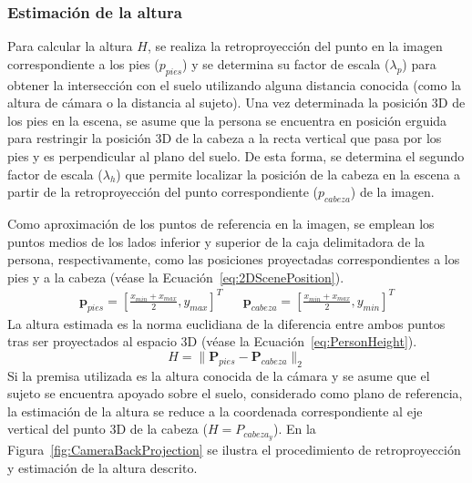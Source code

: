 \subsubsection*{Estimación de la altura}
Para calcular la altura $H$, se realiza la retroproyección del punto en la imagen correspondiente a los pies ($p_{pies}$) y se determina su
factor de escala ($\lambda_p$) para obtener la intersección con el suelo utilizando alguna distancia conocida (como la altura de cámara o la distancia al sujeto).
Una vez determinada la posición 3D de los pies en la escena, se asume que la persona se encuentra en posición erguida para restringir
la posición 3D de la cabeza a la recta vertical que pasa por los pies y es perpendicular al plano del suelo.
De esta forma, se determina el segundo factor de escala ($\lambda_h$) que permite localizar la posición de la cabeza en la escena
a partir de la retroproyección del punto correspondiente ($p_{cabeza}$) de la imagen.
\par
Como aproximación de los puntos de referencia en la imagen, se emplean los puntos medios de los lados inferior y superior de la caja delimitadora
de la persona, respectivamente, como las posiciones proyectadas correspondientes a los pies y a la cabeza (véase la Ecuación~\ref{eq:2DScenePosition}).
\begin{align}\label{eq:2DScenePosition}
  \mathbf{p}_{pies} = \left[ \frac{x_{min} + x_{max}}{2}, y_{max} \right]^T && \mathbf{p}_{cabeza} = \left[ \frac{x_{min} + x_{max}}{2}, y_{min} \right]^T
\end{align}
La altura estimada es la norma euclidiana de la diferencia entre ambos puntos tras ser proyectados al espacio 3D (véase la Ecuación~\ref{eq:PersonHeight}).
\begin{equation}\label{eq:PersonHeight}
H = \|\mathbf{P}_{pies} - \mathbf{P}_{cabeza}\|_2
\end{equation}
Si la premisa utilizada es la altura conocida de la cámara y se asume que el sujeto se encuentra
apoyado sobre el suelo, considerado como plano de referencia, la estimación de la altura se
reduce a la coordenada correspondiente al eje vertical del punto 3D de la cabeza ($H = P_{cabeza_y}$).
En la Figura~\ref{fig:CameraBackProjection} se ilustra el procedimiento de
retroproyección y estimación de la altura descrito.

